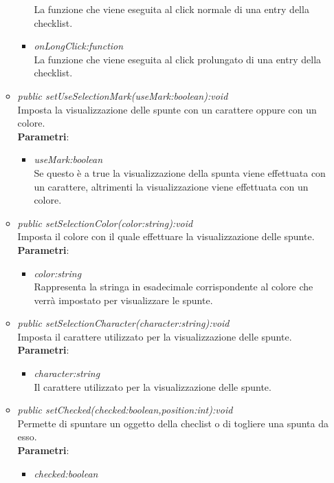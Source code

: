 \begin{itemize}
\begin{itemize}
\begin{itemize}
		La funzione che viene eseguita al click normale di una entry della checklist.
		\item \textit{onLongClick:function}\\
		La funzione che viene eseguita al click prolungato di una entry della checklist.
		\end{itemize} 
\item \textit{public setUseSelectionMark(useMark:boolean):void}\\
	Imposta la visualizzazione delle spunte con un carattere oppure con un colore.
		\\ \textbf{Parametri}: \begin{itemize}
		\item \textit{useMark:boolean}\\
		Se questo è a true la visualizzazione della spunta viene effettuata con un carattere, altrimenti la visualizzazione viene effettuata con un colore.
		\end{itemize}  
	\item \textit{public setSelectionColor(color:string):void}\\
	Imposta il colore con il quale effettuare la visualizzazione delle spunte.
		\\ \textbf{Parametri}: \begin{itemize}
		\item \textit{color:string}\\
		Rappresenta la stringa in esadecimale corrispondente al colore che verrà impostato per visualizzare le spunte.
		\end{itemize}  
	\item \textit{public setSelectionCharacter(character:string):void}\\
	Imposta il carattere utilizzato per la visualizzazione delle spunte.
		\\ \textbf{Parametri}: \begin{itemize}
		\item \textit{character:string}\\
		Il carattere utilizzato per la visualizzazione delle spunte.
		\end{itemize}   
	\item \textit{public setChecked(checked:boolean,position:int):void}\\
	Permette di spuntare un oggetto della checlist o di togliere una spunta da esso.
		\\ \textbf{Parametri}: \begin{itemize}
		\item \textit{checked:boolean}\\

\end{itemize}
\end{itemize}
\end{itemize}
